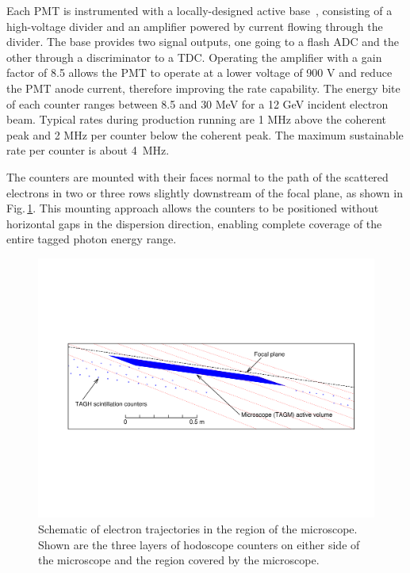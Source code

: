 Each PMT is instrumented with a locally-designed active base~\cite{tagh:base},
consisting of a high-voltage divider and an amplifier powered by current
flowing through the divider. The base provides two signal outputs, one going
to a flash ADC and the other through a discriminator to a TDC.
Operating the amplifier with a gain factor of 8.5 allows the PMT to operate at a
lower voltage of 900 V and reduce the PMT anode current, therefore improving
the rate capability. The energy bite of each counter ranges between 8.5 and
30 MeV for a 12 GeV incident electron beam.  Typical rates during production
running are 1 MHz above the coherent peak and 2 MHz per counter below the
coherent peak. The maximum sustainable rate per counter is about 4~MHz.

The counters are mounted with their faces normal to the path of the
scattered electrons in two or three rows slightly downstream of the focal
plane, as shown in Fig.\,\ref{fig:beam:BEAM_taggerdetectors}.
This mounting approach allows the counters to be positioned without horizontal gaps in
the dispersion direction, enabling complete coverage of the entire
tagged photon energy range.

\begin{figure}[tbp]
\begin{center}
      \includegraphics[width=0.95\linewidth,viewport=80 200 750 400]{figures/BEAM_taggerdetectors.pdf}
\caption{Schematic of electron trajectories in the region of the microscope. Shown are the three layers of hodoscope counters on either side of the microscope and the 
               region covered by the microscope.
       \label{fig:beam:BEAM_taggerdetectors}  }

\end{center}
\end{figure}

